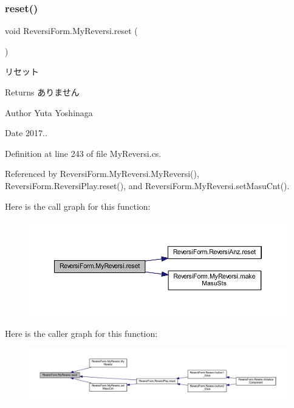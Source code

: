 \subsubsection{\texorpdfstring{reset()}{reset()}}
{\footnotesize\ttfamily void Reversi\+Form.\+My\+Reversi.\+reset (\begin{DoxyParamCaption}{ }\end{DoxyParamCaption})}



リセット 

\begin{DoxyReturn}{Returns}
ありません 
\end{DoxyReturn}
\begin{DoxyAuthor}{Author}
Yuta Yoshinaga 
\end{DoxyAuthor}
\begin{DoxyDate}{Date}
2017.. 
\end{DoxyDate}


Definition at line 243 of file My\+Reversi.\+cs.



Referenced by Reversi\+Form.\+My\+Reversi.\+My\+Reversi(), Reversi\+Form.\+Reversi\+Play.\+reset(), and Reversi\+Form.\+My\+Reversi.\+set\+Masu\+Cnt().

Here is the call graph for this function\+:\nopagebreak
\begin{figure}[H]
\begin{center}
\leavevmode
\includegraphics[width=350pt]{class_reversi_form_1_1_my_reversi_aa8d8e839466c63462954080353cd4a9e_cgraph}
\end{center}
\end{figure}
Here is the caller graph for this function\+:\nopagebreak
\begin{figure}[H]
\begin{center}
\leavevmode
\includegraphics[width=350pt]{class_reversi_form_1_1_my_reversi_aa8d8e839466c63462954080353cd4a9e_icgraph}
\end{center}
\end{figure}
\mbox{\label{class_reversi_form_1_1_my_reversi_a990acf71124e50643c0774c38f8f634b}} 
